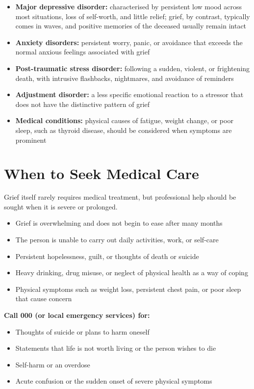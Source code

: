 \begin{itemize}
    \item \textbf{Major depressive disorder:} characterised by persistent low mood across most situations, loss of self-worth, and little relief; grief, by contrast, typically comes in waves, and positive memories of the deceased usually remain intact
    \item \textbf{Anxiety disorders:} persistent worry, panic, or avoidance that exceeds the normal anxious feelings associated with grief
    \item \textbf{Post-traumatic stress disorder:} following a sudden, violent, or frightening death, with intrusive flashbacks, nightmares, and avoidance of reminders
    \item \textbf{Adjustment disorder:} a less specific emotional reaction to a stressor that does not have the distinctive pattern of grief
    \item \textbf{Medical conditions:} physical causes of fatigue, weight change, or poor sleep, such as thyroid disease, should be considered when symptoms are prominent
\end{itemize}

\section*{When to Seek Medical Care}
Grief itself rarely requires medical treatment, but professional help should be sought when it is severe or prolonged.

\begin{itemize}
    \item Grief is overwhelming and does not begin to ease after many months
    \item The person is unable to carry out daily activities, work, or self-care
    \item Persistent hopelessness, guilt, or thoughts of death or suicide
    \item Heavy drinking, drug misuse, or neglect of physical health as a way of coping
    \item Physical symptoms such as weight loss, persistent chest pain, or poor sleep that cause concern
\end{itemize}

\textbf{Call 000 (or local emergency services) for:}
\begin{itemize}
    \item Thoughts of suicide or plans to harm oneself
    \item Statements that life is not worth living or the person wishes to die
    \item Self-harm or an overdose
    \item Acute confusion or the sudden onset of severe physical symptoms
\end{itemize}

